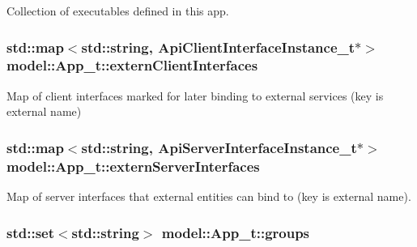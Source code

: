 Collection of executables defined in this app. 

\subsubsection[{\texorpdfstring{extern\+Client\+Interfaces}{externClientInterfaces}}]{\setlength{\rightskip}{0pt plus 5cm}std\+::map$<$std\+::string, {\bf Api\+Client\+Interface\+Instance\+\_\+t}$\ast$$>$ model\+::\+App\+\_\+t\+::extern\+Client\+Interfaces}\hypertarget{structmodel_1_1_app__t_a0980a6ee6effefd237fe09ae57c89028}{}\label{structmodel_1_1_app__t_a0980a6ee6effefd237fe09ae57c89028}


Map of client interfaces marked for later binding to external services (key is external name) 

\subsubsection[{\texorpdfstring{extern\+Server\+Interfaces}{externServerInterfaces}}]{\setlength{\rightskip}{0pt plus 5cm}std\+::map$<$std\+::string, {\bf Api\+Server\+Interface\+Instance\+\_\+t}$\ast$$>$ model\+::\+App\+\_\+t\+::extern\+Server\+Interfaces}\hypertarget{structmodel_1_1_app__t_a27a2337b25bc501f7b52913bd95dd570}{}\label{structmodel_1_1_app__t_a27a2337b25bc501f7b52913bd95dd570}


Map of server interfaces that external entities can bind to (key is external name). 

\subsubsection[{\texorpdfstring{groups}{groups}}]{\setlength{\rightskip}{0pt plus 5cm}std\+::set$<$std\+::string$>$ model\+::\+App\+\_\+t\+::groups}\hypertarget{structmodel_1_1_app__t_a3267219b99e8c66bece84b38938f164a}{}\label{structmodel_1_1_app__t_a3267219b99e8c66bece84b38938f164a}


